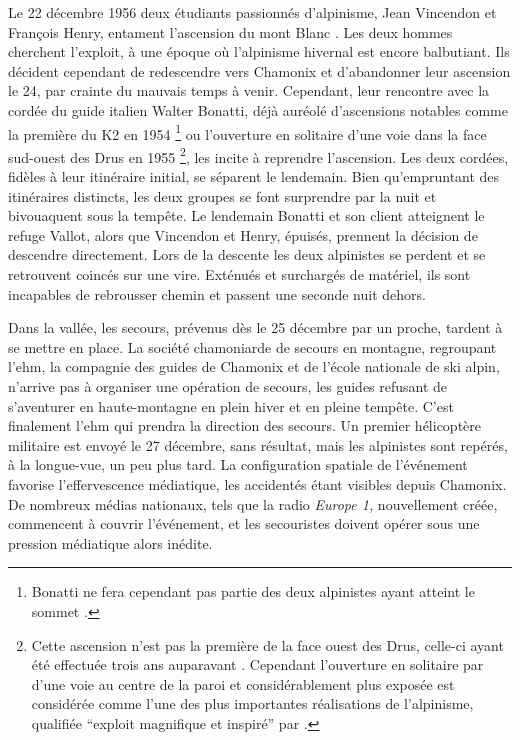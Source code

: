 Le 22 décembre 1956 deux étudiants passionnés d'alpinisme, Jean
Vincendon et François Henry, entament l’ascension du mont Blanc
\autocite{Ballu1997}. Les deux hommes cherchent l'exploit, à une
époque où l'alpinisme hivernal est encore balbutiant. Ils décident
cependant de redescendre vers Chamonix et d'abandonner leur ascension
le 24, par crainte du mauvais temps à venir. Cependant, leur rencontre
avec la cordée du guide italien Walter Bonatti, déjà auréolé
d'ascensions notables comme la première du K2 en 1954
\footnote{Bonatti ne fera cependant pas partie des deux alpinistes
  ayant atteint le sommet \autocite{ContributeursWikipedia2020a}.} ou
l'ouverture en solitaire d'une voie dans la face sud-ouest des Drus en
1955 \footnote{Cette ascension n'est pas la première de la face ouest
  des Drus, celle-ci ayant été effectuée trois ans auparavant
  \autocite{ContributeursWikipedia2020}. Cependant l'ouverture en
  solitaire par  d'une voie au centre de la paroi et
  considérablement plus exposée est considérée comme l'une des plus
  importantes réalisations de l'alpinisme, qualifiée
  \enquote{exploit magnifique et inspiré} par
  \textcite{Robbins2000}.}, les incite à reprendre l’ascension. Les
deux cordées, fidèles à leur itinéraire initial, se séparent le
lendemain. Bien qu'empruntant des itinéraires distincts, les deux
groupes se font surprendre par la nuit et bivouaquent sous la
tempête. Le lendemain Bonatti et son client atteignent le refuge
Vallot, alors que Vincendon et Henry, épuisés, prennent la décision de
descendre directement. Lors de la descente les deux alpinistes se
perdent et se retrouvent coincés sur une \gls{vire}. Exténués et
surchargés de matériel, ils sont incapables de rebrousser chemin et
passent une seconde nuit dehors.

Dans la vallée, les secours, prévenus dès le 25 décembre par un
proche, tardent à se mettre en place. La société chamoniarde de
secours en montagne, regroupant l'\ac{ehm}, la compagnie des guides de
Chamonix et de l'école nationale de ski alpin, n'arrive pas à
organiser une opération de secours, les guides refusant de s'aventurer
en haute-montagne en plein hiver et en pleine tempête. C'est
finalement l'\ac{ehm} qui prendra la direction des secours. Un premier
hélicoptère militaire est envoyé le 27 décembre, sans résultat, mais
les alpinistes sont repérés, à la longue-vue, un peu plus tard. La
configuration spatiale de l'événement favorise l'effervescence
médiatique, les accidentés étant visibles depuis Chamonix. De nombreux
médias nationaux, tels que la radio \emph{Europe 1,} nouvellement
créée, commencent à couvrir l'événement, et les secouristes doivent
opérer sous une pression médiatique alors inédite.


